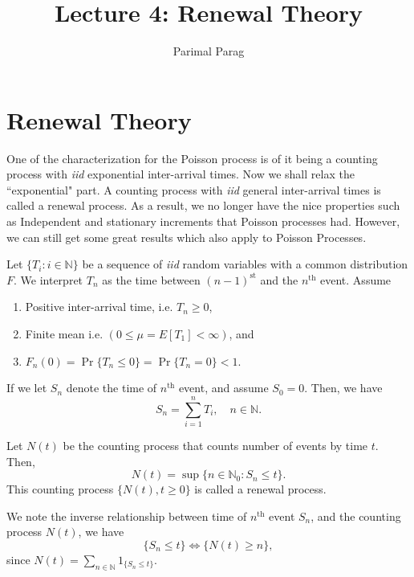 \documentclass[a4paper,10pt]{article}
\title{Lecture 4: Renewal Theory}
\author{Parimal Parag}
\begin{document}
\maketitle

\section{Renewal Theory}
One of the characterization for the Poisson process is of it being a counting process with \emph{iid} exponential inter-arrival times. Now we shall relax the ``exponential" part. A counting process with \emph{iid} general inter-arrival times is called a renewal process.
As a result, we no longer have the nice properties such as Independent and stationary increments that Poisson processes had. However, we can still get some great results which also apply to Poisson Processes. 

\begin{defn}Let $\{T_i: i \in \mathbb{N}\}$ be a sequence of \emph{iid} random variables with a common distribution $F$. We interpret $T_n$ as the time between $(n - 1)^{\mathrm{st}}$ and the $n^{\mathrm{th}}$ event. Assume 
\begin{enumerate}
  \item Positive inter-arrival time, i.e. $T_n \geq 0$,
	\item Finite mean i.e. $(0 \leq \mu = E[T_1] < \infty)$, and
	\item $F_n(0) = \Pr\{T_n \leq 0\} = \Pr\{T_n = 0\} < 1$.
\end{enumerate}
\end{defn}

\begin{defn} If we let $S_n$ denote the time of $n^{\mathrm{th}}$ event, and assume $S_0 = 0$. Then, we have
\begin{equation*} 
S_n = \sum_{i=1}^n T_i, \quad n\in \mathbb{N}. 
\end{equation*}
\end{defn}

\begin{defn} Let $N(t)$ be the counting process that counts number of events by time $t$. Then,
\begin{equation*} 
N(t) = \sup\{n \in \mathbb{N}_0 : S_n \leq t\}.
\end{equation*} 
This counting process $\{N(t), t \geq 0\}$ is called a renewal process.
\end{defn}
\begin{note}
We note the inverse relationship between time of $n^{\mathrm{th}}$ event $S_n$, and the counting process $N(t)$, we have 
\begin{equation}
\label{eq:InverseRelationship}
\{S_n \leq t\} \iff \{N(t) \geq n\},
\end{equation}
since $N(t) = \sum_{n \in \mathbb{N}}1_{\{S_n \leq t\}}$.
\end{note}
\end{document}
